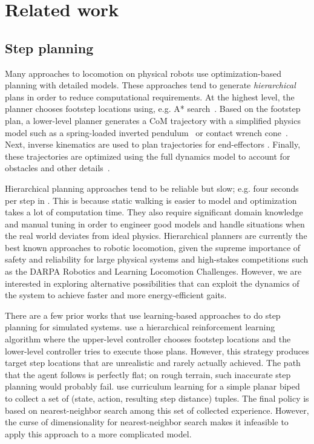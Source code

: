 \documentclass[conference]{IEEEtran}
\newcommand{\nhatch}[1]{{\leavevmode\color{magenta} Nathan: #1}}
\begin{document}
\section{Related work}

\subsection{Step planning}

Many approaches to locomotion on physical robots use optimization-based planning with detailed models.
These approaches tend to generate \emph{hierarchical} plans in order to reduce computational requirements.
At the highest level, the planner chooses footstep locations using, e.g. A* search~\citep{huang2013step}.
Based on the footstep plan, a lower-level planner generates a CoM trajectory with a simplified physics model such as a spring-loaded inverted pendulum~\citep{mordatch2010robust} or contact wrench cone~\citep{dai2016planning}.
Next, inverse kinematics are used to plan trajectories for end-effectors \citep{zucker2010optimization}.
Finally, these trajectories are optimized using the full dynamics model to account for obstacles and other details~\citep{ratliff2009chomp}.

Hierarchical planning approaches tend to be reliable but slow; e.g. four seconds per step in \citet{feng2015optimization}.
This is because static walking is easier to model and optimization takes a lot of computation time.
They also require significant domain knowledge and manual tuning in order to engineer good models and handle situations when the real world deviates from ideal physics.
Hierarchical planners are currently the best known approaches to robotic locomotion, given the supreme importance of safety and reliability for large physical systems and high-stakes competitions such as the DARPA Robotics and Learning Locomotion Challenges.
However, we are interested in exploring alternative possibilities that can exploit the dynamics of the system to achieve faster and more energy-efficient gaits.


There are a few prior works that use learning-based approaches to do step planning for simulated systems.
\citet{peng2017deeploco} use a hierarchical reinforcement learning algorithm where the upper-level controller chooses footstep locations and the lower-level controller tries to execute those plans.
However, this strategy produces target step locations that are unrealistic and rarely actually achieved.
The path that the agent follows is perfectly flat; on rough terrain, such inaccurate step planning would probably fail.
\citet{karpathy2012curriculum} use curriculum learning for a simple planar biped to collect a set of (state, action, resulting step distance) tuples.
The final policy is based on nearest-neighbor search among this set of collected experience.
However, the curse of dimensionality for nearest-neighbor search
makes it infeasible to apply this approach to a more complicated model.
\end{document}
